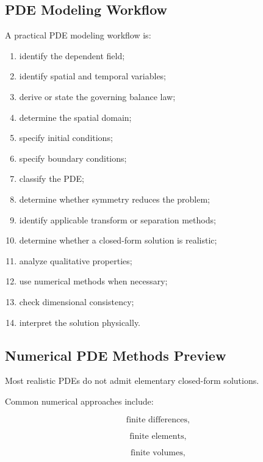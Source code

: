\subsection{PDE Modeling Workflow}
\label{subsec:pde-modeling-workflow}

A practical PDE modeling workflow is:

\begin{enumerate}
    \item identify the dependent field;
    \item identify spatial and temporal variables;
    \item derive or state the governing balance law;
    \item determine the spatial domain;
    \item specify initial conditions;
    \item specify boundary conditions;
    \item classify the PDE;
    \item determine whether symmetry reduces the problem;
    \item identify applicable transform or separation methods;
    \item determine whether a closed-form solution is realistic;
    \item analyze qualitative properties;
    \item use numerical methods when necessary;
    \item check dimensional consistency;
    \item interpret the solution physically.
\end{enumerate}

\subsection{Numerical PDE Methods Preview}
\label{subsec:numerical-pde-preview}

Most realistic PDEs do not admit elementary closed-form solutions.

Common numerical approaches include:

\[
\boxed{
\text{finite differences},
}
\]

\[
\boxed{
\text{finite elements},
}
\]

\[
\boxed{
\text{finite volumes},
}
\]

